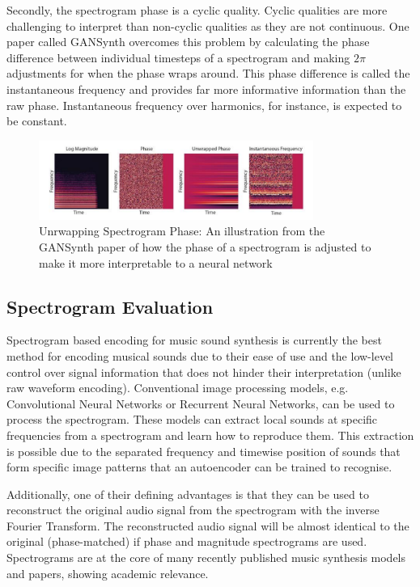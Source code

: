 Secondly, the spectrogram phase is a cyclic quality. Cyclic qualities are more challenging to interpret than non-cyclic qualities as they are not continuous. One paper called GANSynth\cite{GANSynth} overcomes this problem by calculating the phase difference between individual timesteps of a spectrogram and making $2\pi$  adjustments for when the phase wraps around. This phase difference is called the instantaneous frequency and provides far more informative information than the raw phase. Instantaneous frequency over harmonics, for instance, is expected to be constant.

\begin{figure}[H]
    \centering
    \includegraphics[width=0.8\textwidth]{literature_review/PhaseAdjustment.png}
    \caption{Unrwapping Spectrogram Phase: An illustration from the GANSynth paper of how the phase of a spectrogram is adjusted to make it more interpretable to a neural network\cite{GANSynth}}
    \label{fig:phase_unwrapping}
\end{figure}

\subsection{Spectrogram Evaluation}

Spectrogram based encoding for music sound synthesis is currently the best method for encoding musical sounds due to their ease of use and the low-level control over signal information that does not hinder their interpretation (unlike raw waveform encoding). Conventional image processing models, e.g. Convolutional Neural Networks or Recurrent Neural Networks, can be used to process the spectrogram. These models can extract local sounds at specific frequencies from a spectrogram and learn how to reproduce them. This extraction is possible due to the separated frequency and timewise position of sounds that form specific image patterns that an autoencoder can be trained to recognise.

Additionally, one of their defining advantages is that they can be used to reconstruct the original audio signal from the spectrogram with the inverse Fourier Transform. The reconstructed audio signal will be almost identical to the original (phase-matched) if phase and magnitude spectrograms are used.
Spectrograms are at the core of many recently published music synthesis models and papers, showing academic relevance.

